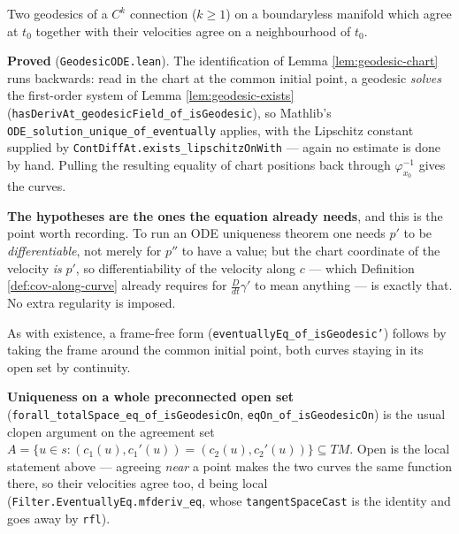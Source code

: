 \begin{lemma}
  \label{lem:geodesic-unique}
  \leanok
  Two geodesics of a $C^k$ connection ($k \ge 1$) on a boundaryless manifold which agree at
  $t_0$ together with their velocities agree on a neighbourhood of $t_0$.

  \textbf{Proved} (\texttt{GeodesicODE.lean}). The identification of
  Lemma \ref{lem:geodesic-chart} runs backwards: read in the chart at the common initial point,
  a geodesic \emph{solves} the first-order system of Lemma \ref{lem:geodesic-exists}
  (\texttt{hasDerivAt\_geodesicField\_of\_isGeodesic}), so Mathlib's
  \texttt{ODE\_solution\_unique\_of\_eventually} applies, with the Lipschitz constant supplied by
  \texttt{ContDiffAt.exists\_lipschitzOnWith} --- again no estimate is done by hand. Pulling the
  resulting equality of chart positions back through $\varphi_{x_0}^{-1}$ gives the curves.

  \textbf{The hypotheses are the ones the equation already needs}, and this is the point worth
  recording. To run an ODE uniqueness theorem one needs $p'$ to be \emph{differentiable}, not
  merely for $p''$ to have a value; but the chart coordinate of the velocity \emph{is} $p'$, so
  differentiability of the velocity along $c$ --- which
  Definition \ref{def:cov-along-curve} already requires for $\frac{D}{dt}\gamma'$ to mean
  anything --- is exactly that. No extra regularity is imposed.

  As with existence, a frame-free form (\texttt{eventuallyEq\_of\_isGeodesic'}) follows by
  taking the frame around the common initial point, both curves staying in its open set by
  continuity.

  \textbf{Uniqueness on a whole preconnected open set}
  (\texttt{forall\_totalSpace\_eq\_of\_isGeodesicOn}, \texttt{eqOn\_of\_isGeodesicOn}) is the
  usual clopen argument on the agreement set
  $A = \{u \in s : (c_1(u),c_1'(u)) = (c_2(u),c_2'(u))\} \subseteq TM$. Open is the local
  statement above --- agreeing \emph{near} a point makes the two curves the same function there,
  so their velocities agree too, $\mathrm{d}$ being local
  (\texttt{Filter.EventuallyEq.mfderiv\_eq}, whose \texttt{tangentSpaceCast} is the identity and
  goes away by \texttt{rfl}).


\end{lemma}

